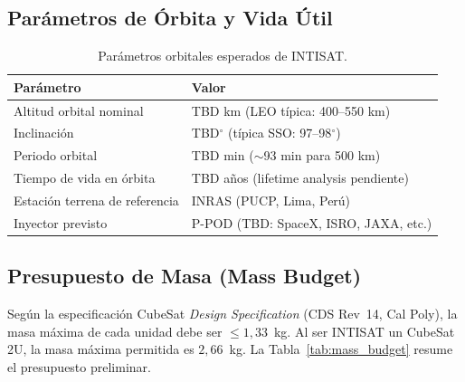 \subsection{Parámetros de Órbita y Vida Útil}
\begin{table}[h]
\centering
\caption{Parámetros orbitales esperados de INTISAT.}
\label{tab:orbita}
\begin{tabular}{ll}
\toprule
\textbf{Parámetro} & \textbf{Valor} \\
\midrule
Altitud orbital nominal           & TBD km (LEO típica: 400--550 km) \\
Inclinación                       & TBD$^\circ$ (típica SSO: 97--98$^\circ$) \\
Periodo orbital                   & TBD min ($\sim$93 min para 500 km) \\
Tiempo de vida en órbita          & TBD años (lifetime analysis pendiente) \\
Estación terrena de referencia    & INRAS (PUCP, Lima, Perú) \\
Inyector previsto                 & P-POD (TBD: SpaceX, ISRO, JAXA, etc.) \\
\bottomrule
\end{tabular}
\end{table}

\subsection{Presupuesto de Masa (Mass Budget)}
Según la especificación CubeSat \textit{Design Specification} (CDS Rev~14, Cal Poly), la masa máxima de cada unidad debe ser $\le 1{,}33$~kg. Al ser INTISAT un CubeSat 2U, la masa máxima permitida es $2{,}66$~kg. La Tabla~\ref{tab:mass_budget} resume el presupuesto preliminar.

